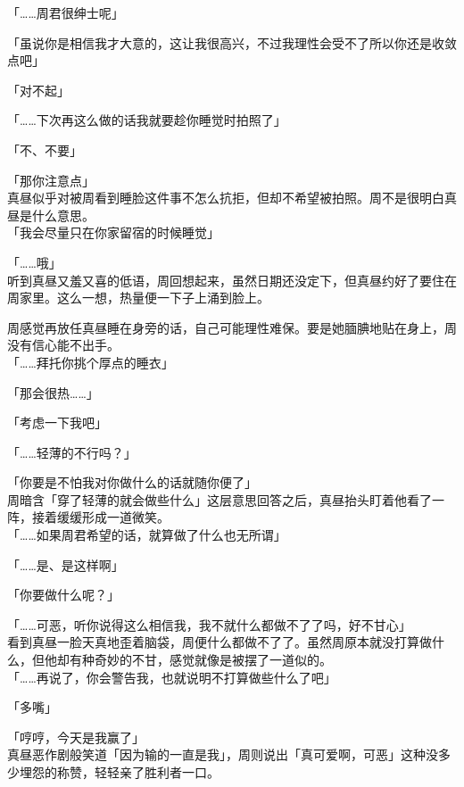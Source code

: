 「……周君很绅士呢」

「虽说你是相信我才大意的，这让我很高兴，不过我理性会受不了所以你还是收敛点吧」

「对不起」

「……下次再这么做的话我就要趁你睡觉时拍照了」

「不、不要」

「那你注意点」\\

真昼似乎对被周看到睡脸这件事不怎么抗拒，但却不希望被拍照。周不是很明白真昼是什么意思。\\

「我会尽量只在你家留宿的时候睡觉」

「……哦」\\

听到真昼又羞又喜的低语，周回想起来，虽然日期还没定下，但真昼约好了要住在周家里。这么一想，热量便一下子上涌到脸上。%

周感觉再放任真昼睡在身旁的话，自己可能理性难保。要是她腼腆地贴在身上，周没有信心能不出手。\\

「……拜托你挑个厚点的睡衣」

「那会很热……」

「考虑一下我吧」

「……轻薄的不行吗？」

「你要是不怕我对你做什么的话就随你便了」\\

周暗含「穿了轻薄的就会做些什么」这层意思回答之后，真昼抬头盯着他看了一阵，接着缓缓形成一道微笑。\\

「……如果周君希望的话，就算做了什么也无所谓」

「……是、是这样啊」

「你要做什么呢？」

「……可恶，听你说得这么相信我，我不就什么都做不了了吗，好不甘心」\\

看到真昼一脸天真地歪着脑袋，周便什么都做不了了。虽然周原本就没打算做什么，但他却有种奇妙的不甘，感觉就像是被摆了一道似的。\\

「……再说了，你会警告我，也就说明不打算做些什么了吧」

「多嘴」

「哼哼，今天是我赢了」\\

真昼恶作剧般笑道「因为输的一直是我」，周则说出「真可爱啊，可恶」这种没多少埋怨的称赞，轻轻亲了胜利者一口。

